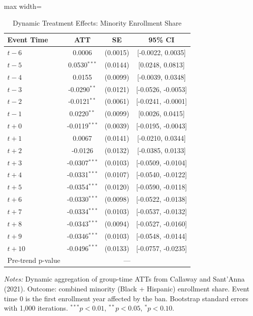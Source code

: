 \begin{table}[htbp]
\centering
\caption{Dynamic Treatment Effects: Minority Enrollment Share}
\label{tab:eventstudy}
\begin{adjustbox}{max width=\textwidth}
\begin{tabular}{lccc}
\hline\hline
Event Time & ATT & SE & 95\% CI \\
\hline
$t  -6$ & 0.0006 & (0.0015) & [-0.0022, 0.0035] \\
$t  -5$ & 0.0530$^{***}$ & (0.0144) & [0.0248, 0.0813] \\
$t  -4$ & 0.0155 & (0.0099) & [-0.0039, 0.0348] \\
$t  -3$ & -0.0290$^{**}$ & (0.0121) & [-0.0526, -0.0053] \\
$t  -2$ & -0.0121$^{**}$ & (0.0061) & [-0.0241, -0.0001] \\
$t  -1$ & 0.0220$^{**}$ & (0.0099) & [0.0026, 0.0415] \\
\addlinespace
\addlinespace
$t + 0$ & -0.0119$^{***}$ & (0.0039) & [-0.0195, -0.0043] \\
$t + 1$ & 0.0067 & (0.0141) & [-0.0210, 0.0344] \\
$t + 2$ & -0.0126 & (0.0132) & [-0.0385, 0.0133] \\
$t + 3$ & -0.0307$^{***}$ & (0.0103) & [-0.0509, -0.0104] \\
$t + 4$ & -0.0331$^{***}$ & (0.0107) & [-0.0540, -0.0122] \\
$t + 5$ & -0.0354$^{***}$ & (0.0120) & [-0.0590, -0.0118] \\
$t + 6$ & -0.0330$^{***}$ & (0.0098) & [-0.0522, -0.0138] \\
$t + 7$ & -0.0334$^{***}$ & (0.0103) & [-0.0537, -0.0132] \\
$t + 8$ & -0.0343$^{***}$ & (0.0094) & [-0.0527, -0.0160] \\
$t + 9$ & -0.0346$^{***}$ & (0.0103) & [-0.0548, -0.0144] \\
$t + 10$ & -0.0496$^{***}$ & (0.0133) & [-0.0757, -0.0235] \\
\hline
Pre-trend p-value & \multicolumn{3}{c}{---} \\
\hline\hline
\end{tabular}
\end{adjustbox}
\begin{tablenotes}
\item \textit{Notes:} Dynamic aggregation of group-time ATTs from Callaway and Sant'Anna (2021). Outcome: combined minority (Black + Hispanic) enrollment share. Event time 0 is the first enrollment year affected by the ban. Bootstrap standard errors with 1,000 iterations. $^{***}p<0.01$, $^{**}p<0.05$, $^{*}p<0.10$.
\end{tablenotes}
\end{table}
